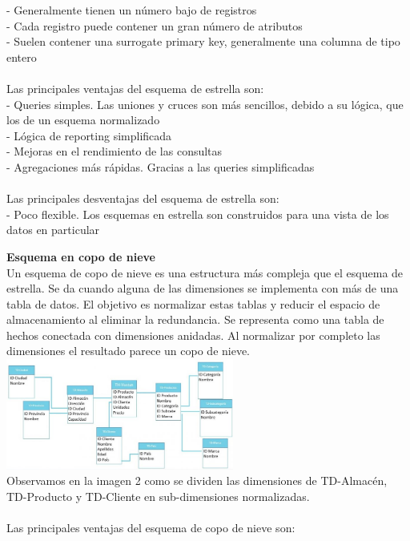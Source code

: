 \documentclass[twoside,twocolumn]{article}
\begin{document}
\begin{enumerate}
- Generalmente tienen un número bajo de registros\textbf{}\\
- Cada registro puede contener un gran número de atributos\textbf{}\\
- Suelen contener una surrogate primary key, generalmente una columna de tipo entero\textbf{}\\
\textbf{}\\
Las principales ventajas del esquema de estrella son:\textbf{}\\
- Queries simples. Las uniones y cruces son más sencillos, debido a su lógica, que los de un esquema normalizado\textbf{}\\
- Lógica de reporting simplificada\textbf{}\\
- Mejoras en el rendimiento de las consultas\textbf{}\\
- Agregaciones más rápidas. Gracias a las queries simplificadas\textbf{}\\
\textbf{}\\
Las principales desventajas del esquema de estrella son:\textbf{}\\
- Poco flexible. Los esquemas en estrella son construidos para una vista de los datos en particular


\textbf{Esquema en copo de nieve}\\
Un esquema de copo de nieve es una estructura más compleja que el esquema de estrella. Se da cuando alguna de las dimensiones se implementa con más de una tabla de datos.
El objetivo es normalizar estas tablas y reducir el espacio de almacenamiento al eliminar la redundancia.
Se representa como una tabla de hechos conectada con dimensiones anidadas. Al normalizar por completo las dimensiones el resultado parece un copo de nieve.\\
\includegraphics[width=7.5cm]{Imagenes/modelo3}
\textbf{}\\
Observamos en la imagen 2 como se dividen las dimensiones de TD-Almacén, TD-Producto y TD-Cliente en sub-dimensiones normalizadas.\textbf{}\\
\textbf{}\\
Las principales ventajas del esquema de copo de nieve son:\textbf{}\\


\end{enumerate}
\end{document}
